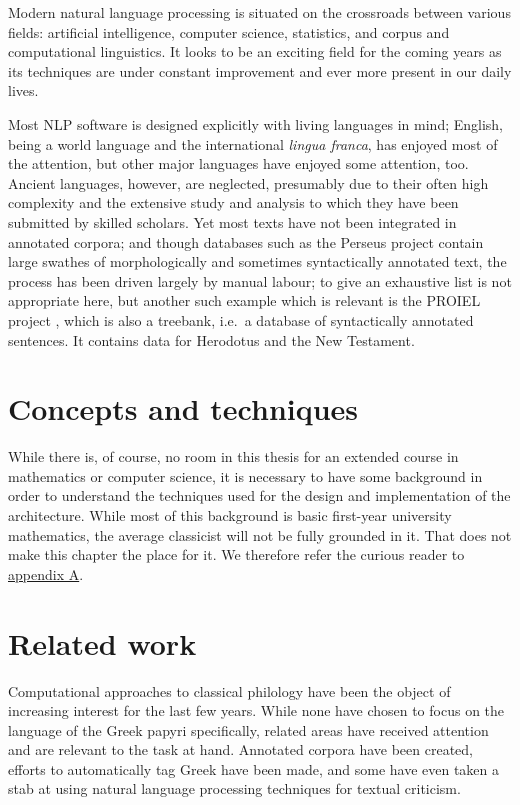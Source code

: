 Modern natural language processing is situated on the crossroads
between various fields: artificial intelligence, computer science,
statistics, and corpus and computational linguistics. It looks to be
an exciting field for the coming years as its techniques are under
constant improvement and ever more present in our daily lives.

Most NLP software is designed explicitly with living languages in
mind; English, being a world language and the international
\textit{lingua franca}, has enjoyed most of the attention, but other
major languages have enjoyed some attention, too. Ancient languages,
however, are neglected, presumably due to their often high complexity
and the extensive study and analysis to which they have been submitted
by skilled scholars. Yet most texts have not been integrated in
annotated corpora; and though databases such as the Perseus project
contain large swathes of morphologically and sometimes syntactically
annotated text, the process has been driven largely by manual labour;
to give an exhaustive list is not appropriate here, but another such
example which is relevant is the PROIEL project \citep{proiel}, which
is also a treebank, i.e.\ a database of syntactically annotated
sentences. It contains data for Herodotus and the New Testament.

\section{Concepts and techniques}
\label{sec:shortconcepts}
While there is, of course, no room in this thesis for an extended
course in mathematics or computer science, it is necessary to have
some background in order to understand the techniques used for the
design and implementation of the architecture. While most of this
background is basic first-year university mathematics, the average
classicist will not be fully grounded in it. That does not make this
chapter the place for it. We therefore refer the curious reader to
\hyperref[chap:conceptstechniques]{appendix A}.

\section{Related work}
\label{sec:relatedwork}
Computational approaches to classical philology have been the object
of increasing interest for the last few years. While none have chosen
to focus on the language of the Greek papyri specifically, related
areas have received attention and are relevant to the task at
hand. Annotated corpora have been created, efforts to automatically
tag Greek have been made, and some have even taken a stab at using
natural language processing techniques for textual criticism. 

